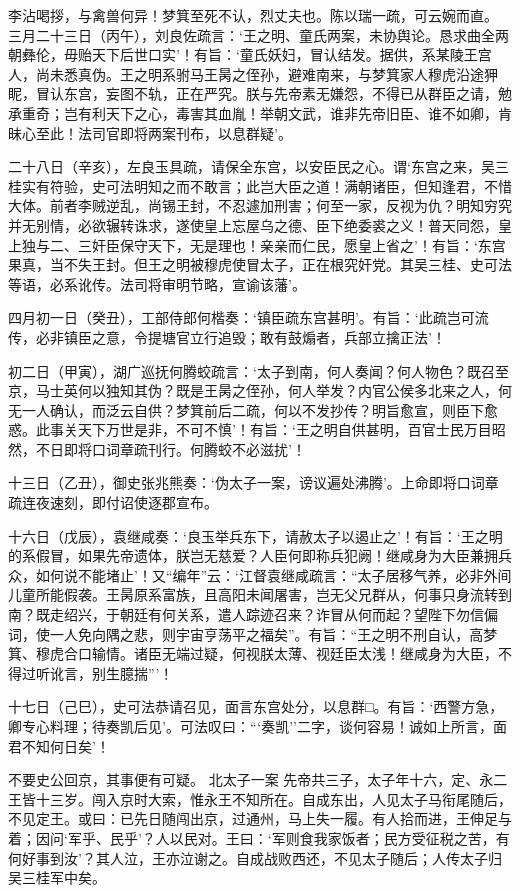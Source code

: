 \documentclass[]{article}
\begin{document}
李沾喝拶，与禽兽何异！梦箕至死不认，烈丈夫也。陈以瑞一疏，可云婉而直。
三月二十三日（丙午），刘良佐疏言：`王之明、童氏两案，未协舆论。恳求曲全两朝彝伦，毋贻天下后世口实'！有旨：`童氏妖妇，冒认结发。据供，系某陵王宫人，尚未悉真伪。王之明系驸马王昺之侄孙，避难南来，与梦箕家人穆虎沿途狎眤，冒认东宫，妄图不轨，正在严究。朕与先帝素无嫌怨，不得已从群臣之请，勉承重奇；岂有利天下之心，毒害其血胤！举朝文武，谁非先帝旧臣、谁不如卿，肯昧心至此！法司官即将两案刊布，以息群疑'。

二十八日（辛亥），左良玉具疏，请保全东宫，以安臣民之心。谓`东宫之来，吴三桂实有符验，史可法明知之而不敢言；此岂大臣之道！满朝诸臣，但知逢君，不惜大体。前者李贼逆乱，尚锡王封，不忍遽加刑害；何至一家，反视为仇？明知穷究并无别情，必欲辗转诛求，遂使皇上忘屋乌之德、臣下绝委裘之义！普天同怨，皇上独与二、三奸臣保守天下，无是理也！亲亲而仁民，愿皇上省之'！有旨：`东宫果真，当不失王封。但王之明被穆虎使冒太子，正在根究奸党。其吴三桂、史可法等语，必系讹传。法司将审明节略，宣谕该藩'。

四月初一日（癸丑），工部侍郎何楷奏：`镇臣疏东宫甚明'。有旨：`此疏岂可流传，必非镇臣之意，令提塘官立行追毁；敢有鼓煽者，兵部立擒正法'！

初二日（甲寅），湖广巡抚何腾蛟疏言：`太子到南，何人奏闻？何人物色？既召至京，马士英何以独知其伪？既是王昺之侄孙，何人举发？内官公侯多北来之人，何无一人确认，而泛云自供？梦箕前后二疏，何以不发抄传？明旨愈宣，则臣下愈惑。此事关天下万世是非，不可不慎'！有旨：`王之明自供甚明，百官士民万目昭然，不日即将口词章疏刊行。何腾蛟不必滋扰'！

十三日（乙丑），御史张兆熊奏：`伪太子一案，谤议遍处沸腾'。上命即将口词章疏连夜速刻，即付诏使逐郡宣布。

十六日（戊辰），袁继咸奏：`良玉举兵东下，请赦太子以遏止之'！有旨：`王之明的系假冒，如果先帝遗体，朕岂无慈爱？人臣何即称兵犯阙！继咸身为大臣兼拥兵众，如何说不能堵止'！又``编年''云：`江督袁继咸疏言：``太子居移气养，必非外间儿童所能假袭。王昺原系富族，且高阳未闻屠害，岂无父兄群从，何事只身流转到南？既走绍兴，于朝廷有何关系，遣人踪迹召来？诈冒从何而起？望陛下勿信偏词，使一人免向隅之悲，则宇宙亨荡平之福矣''。有旨：``王之明不刑自认，高梦箕、穆虎合口输情。诸臣无端过疑，何视朕太薄、视廷臣太浅！继咸身为大臣，不得过听讹言，别生臆揣'''！

十七日（己巳），史可法恭请召见，面言东宫处分，以息群□。有旨：`西警方急，卿专心料理；待奏凯后见'。可法叹曰：```奏凯''二字，谈何容易！诚如上所言，面君不知何日矣'！

不要史公回京，其事便有可疑。 北太子一案
先帝共三子，太子年十六，定、永二王皆十三岁。闯入京时大索，惟永王不知所在。自成东出，人见太子马衔尾随后，不见定王。或曰：已先日随闯出京，过通州，马上失一履。有人拾而进，王伸足与着；因问`军乎、民乎'？人以民对。王曰：`军则食我家饭者；民方受征税之苦，有何好事到汝'？其人泣，王亦泣谢之。自成战败西还，不见太子随后；人传太子归吴三桂军中矣。
\end{document}
